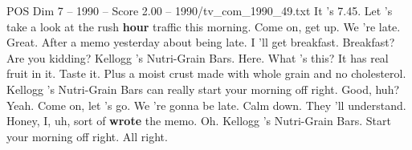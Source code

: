 \begin{textsample}{POS Dim 7 – 1990 – Score 2.00 – 1990/tv\_com\_1990\_49.txt}  \label{ex:f7_pos_061}
It 's 7.45.
Let 's take a look at the rush \textbf{hour} traffic this morning.
Come on, get up.
We 're late.
Great.
After a memo yesterday about being late.
I 'll get breakfast.
Breakfast?
Are you kidding?
Kellogg 's Nutri-Grain Bars.
Here.
What 's this?
It has real fruit in it.
Taste it.
Plus a moist crust made with whole grain and no cholesterol.
Kellogg 's Nutri-Grain Bars can really start your morning off right.
Good, huh?
Yeah.
Come on, let 's go.
We 're gonna be late.
Calm down.
They 'll understand.
Honey, I, uh, sort of \textbf{wrote} the memo.
Oh.
Kellogg 's Nutri-Grain Bars.
Start your morning off right.
All right.

\end{textsample}
